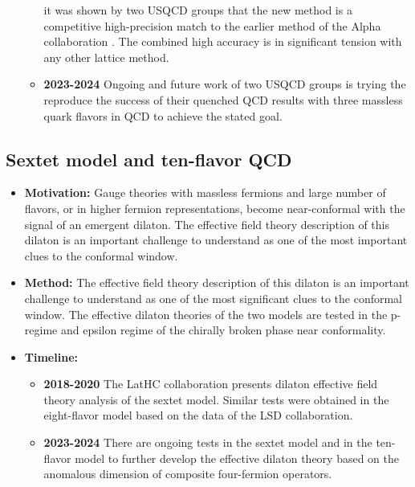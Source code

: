 \documentclass[12pt,hyperpdf]{article}
\begin{document}
\begin{itemize}
\begin{itemize}
          it was shown by two USQCD groups that the new method is a
          competitive high-precision match to the earlier method of
          the Alpha collaboration
          \cite{Hasenfratz:2023bok,Wong:2023jvr}. The combined high
          accuracy is in significant tension with any other lattice
          method. 
	\item{\bf 2023-2024}  Ongoing and future work of two USQCD groups
          is trying the reproduce the success of their quenched QCD
          results with three massless quark flavors in QCD to achieve
          the stated  goal.  
\end{itemize}
\end{itemize}


\subsection{Sextet model and ten-flavor QCD}
\begin{itemize}
\item{\bf Motivation:} Gauge theories with massless fermions and large
  number of flavors, or in higher fermion representations, become
  near-conformal with the signal of an emergent dilaton. The effective
  field theory description of this dilaton is an important challenge
  to understand as one of the most important clues to the conformal
  window. 
  \item{\bf Method:} The effective field theory description of this
    dilaton is an important challenge to understand as one of the most
    significant clues to the conformal window. The effective dilaton
    theories of the two models are tested in the p-regime and epsilon
    regime of the chirally broken phase near conformality.  
\item{\bf Timeline:}
\begin{itemize}
   \item{\bf 2018-2020} The LatHC collaboration presents dilaton effective
     field theory analysis  of  the sextet model. Similar tests were
     obtained in the eight-flavor model based on the data of the LSD
     collaboration.
   \item{\bf 2023-2024} There are ongoing tests in the sextet model and in
     the ten-flavor model to further develop the effective dilaton
     theory based on the anomalous dimension of composite four-fermion
     operators.
\end{itemize}
\end{itemize}
\end{document}
